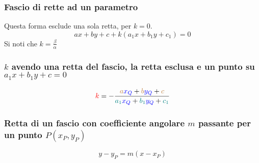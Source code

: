\subsubsection{Fascio di rette ad un parametro}
Questa forma esclude una sola retta, per $k = 0$.
\begin{equation*}
ax + by + c + k(a_1x + b_1y + c_1) = 0
\end{equation*}
Si noti che $k = \frac{\beta}{\alpha}$

\subsubsection{$k$ avendo una retta del fascio, la retta esclusa e un punto su $a_1x + b_1y + c = 0$}
\begin{center}
\end{center}
\begin{equation*}
\mathcolor{red}{k} = -\frac{
	\mathcolor{brown}{a}\mathcolor{blue}{x_Q} + \mathcolor{brown}{b}\mathcolor{blue}{y_Q} +
	\mathcolor{brown}{c}
}{
	\mathcolor{teal}{a_1}\mathcolor{blue}{x_Q} + \mathcolor{teal}{b_1}\mathcolor{blue}{y_Q} +
	\mathcolor{teal}{c_1}
}
\end{equation*}

\subsubsection{Retta di un fascio con coefficiente angolare $m$ passante per un punto $P(x_P,y_P)$}
\begin{equation*}
y-y_P = m(x-x_P)
\end{equation*}

